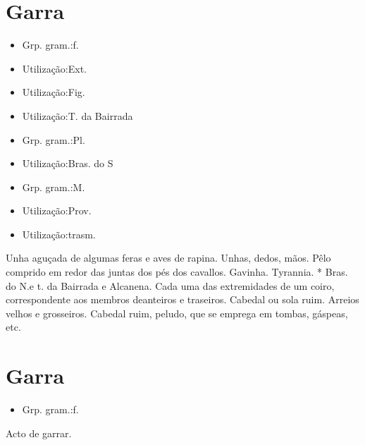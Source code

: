 \section{Garra}
\begin{itemize}
\item {Grp. gram.:f.}
\end{itemize}
\begin{itemize}
\item {Utilização:Ext.}
\end{itemize}
\begin{itemize}
\item {Utilização:Fig.}
\end{itemize}
\begin{itemize}
\item {Utilização:T. da Bairrada}
\end{itemize}
\begin{itemize}
\item {Grp. gram.:Pl.}
\end{itemize}
\begin{itemize}
\item {Utilização:Bras. do S}
\end{itemize}
\begin{itemize}
\item {Grp. gram.:M.}
\end{itemize}
\begin{itemize}
\item {Utilização:Prov.}
\end{itemize}
\begin{itemize}
\item {Utilização:trasm.}
\end{itemize}
Unha aguçada de algumas feras e aves de rapina.
Unhas, dedos, mãos.
Pêlo comprido em redor das juntas dos pés dos cavallos.
Gavinha.
Tyrannia.
* \textunderscore Bras. do N.\textunderscore  e \textunderscore t. da Bairrada e Alcanena\textunderscore .
Cada uma das extremidades de um coiro, correspondente aos membros deanteiros e traseiros.
Cabedal ou sola ruim.
Arreios velhos e grosseiros.
Cabedal ruim, peludo, que se emprega em tombas, gáspeas, etc.
\section{Garra}
\begin{itemize}
\item {Grp. gram.:f.}
\end{itemize}
Acto de garrar.
